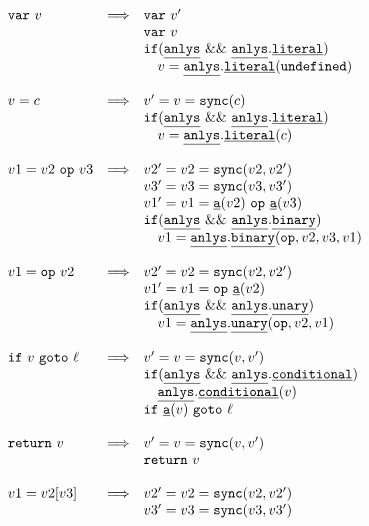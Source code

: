 \documentclass{sig-alternate}
\newcommand \dsl [1] {\ensuremath{{\tt #1}}\xspace}
\newcommand \usl [1] {\mbox{\underline{\tt #1}}\xspace}
\newcommand \Sync{\dsl{sync}}
\newcommand \Actual{\usl{a}}
\newcommand \analysis{\usl{anlys}}
\begin{document}
\begin{figure}
{\scriptsize\[
\begin{array}{lrl}
   \dsl{var}\ v& \Longrightarrow & \dsl{var}\ v'\\
                     & & \dsl{var}\ v\\
& & \dsl{if} (\analysis \ \&\&\  \analysis.\usl{literal})\\
& & \quad v = \analysis.\usl{literal}(\dsl{undefined})\\
& & \\
    v = c & \Longrightarrow & v ' = v = \Sync(c)\\
& & \dsl{if} (\analysis \ \&\&\  \analysis.\usl{literal})\\
& & \quad v = \analysis.\usl{literal}(c)\\
& & \\
    v1 = v2\ \dsl{op}\ v3 & \Longrightarrow & v2' = v2 = \Sync(v2, v2')\\
& & v3' = v3 = \Sync(v3, v3')\\
& & v1' = v1 = \Actual(v2)\ \dsl{op}\ \Actual(v3)\\
& & \dsl{if} (\analysis \ \&\&\  \analysis.\usl{binary})\\
& & \quad v1 = \analysis.\usl{binary}(\dsl{op}, v2, v3, v1)\\
& & \\
    v1 = \dsl{op}\ v2 & \Longrightarrow & v2' = v2 = \Sync(v2, v2')\\
& & v1' = v1 = \dsl{op}\ \Actual(v2)\\
& & \dsl{if} (\analysis \ \&\&\  \analysis.\usl{unary})\\
& & \quad v1 = \analysis.\usl{unary}(\dsl{op}, v2, v1)\\
& & \\
    \dsl{if}\ v \ \dsl{goto}\ \ell & \Longrightarrow & v' = v =
    \Sync(v, v')\\
& & \dsl{if} (\analysis \ \&\&\  \analysis.\usl{conditional})\\
& & \quad \analysis.\usl{conditional}(v)\\
    & & \dsl{if}\ \Actual(v) \ \dsl{goto}\ \ell \\
& & \\
    \dsl{return}\ v & \Longrightarrow & v' = v = \Sync(v, v')\\
    & & \dsl{return}\ v \\
& & \\
    v1 = v2[v3] & \Longrightarrow & v2' = v2 =\Sync(v2, v2')\\
& & v3' = v3 = \Sync(v3, v3')\\

\end{array}\]}
\end{figure}
\end{document}
